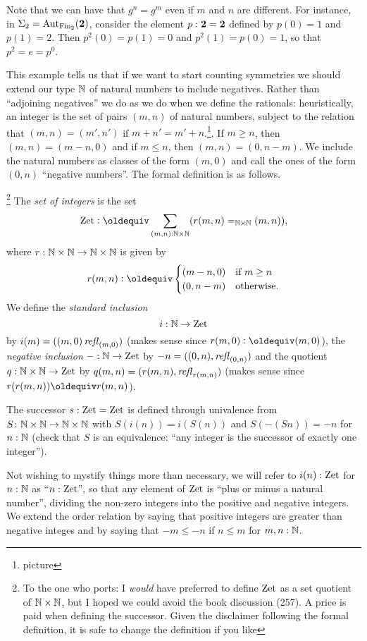 {\begin{example}
Note that we can have that $g^n=g^m$ even if $m$ and $n$ are different.  For instance, in $\Sigma_2=\mathrm{Aut}_{\operatorname{Fin}_2}(\mathbf{2} )$, consider the element $p:\mathbf{2} =\mathbf{2} $ defined by $p(0)=1$ and $p(1)=2$.  Then $p^2(0)=p(1)=0$ and $p^2(1)=p(0)=1$, so that $p^2=e=p^0$.
   \end{example}
This example tells us that if we want to start counting symmetries we should extend our type $\mathbb{N}$ of natural numbers to include negatives.  Rather than ``adjoining negatives'' we do as we do when we define the rationals: heuristically, an integer is the set of pairs $(m,n)$ of natural numbers, subject to the relation that $(m,n)=(m',n')$ if $m+n'=m'+n$.\footnote{picture}.  If $m\geq n$, then $(m,n)=(m-n,0)$ and if $m\leq n$, then $(m,n)=(0,n-m)$.  We include the natural numbers as classes of the form $(m,0)$ and call the ones of the form $(0,n)$ ``negative numbers''.  The formal definition is as follows.
\begin{definition}
\footnote{To the one who ports: I \emph{would} have preferred to define $\mathrm{Zet}$ as a set quotient of $\mathbb{N}\times\mathbb{N}$, but I hoped we could avoid the book discussion (257).  A price is paid when defining the successor.  Given the disclaimer following the formal definition, it is safe to change the definition if you like}
  The \emph{set of integers} is the set
$$\zet\defequi \sum_{(m,n):\NN\times\NN}(r(m,n)=_{\NN\times\NN}(m,n)),$$
where $r:\mathbb{N}\times\mathbb{N}\to\mathbb{N}\times\mathbb{N}$ is given by
$$r(m,n)\defequi
\begin{cases}
  (m-n,0)&\text{if $m\geq n$}\\
  (0,n-m)&\text{otherwise.}
\end{cases}
$$
We define the \emph{standard inclusion} 
$$i:\mathbb{N}\to\mathrm{Zet}$$ by $i(m)=((m,0)\mathop{{\it refl}_{(m,0)}})$ (makes sense since $r(m,0)\defequi(m,0)$), the \emph{negative inclusion} $-:\mathbb{N}\to\mathrm{Zet}$ by $-n=((0,n),\mathop{{\it refl}_{(0,n)}})$ and the quotient $q:\mathbb{N}\times\mathbb{N}\to\mathrm{Zet}$ by $q(m,n)=(r(m,n),\mathop{{\it refl}_{r(m,n)}})$ (makes sense since $r(r(m,n))\oldequiv r(m,n)$).  

The successor $s:\mathrm{Zet}=\mathrm{Zet}$ is defined through univalence from $S\colon\mathbb{N}\times\mathbb{N}\to\mathbb{N}\times\mathbb{N}$ with $S(i(n))=i(S(n))$  and $S(-(Sn))=-n$ for $n:\mathbb{N}$ (check that $S$ is an equivalence: ``any integer is the successor of exactly one integer'').
\end{definition}

Not wishing to mystify things more than necessary, we will refer to $i(n):\mathrm{Zet}$ for $n:\mathbb{N}$ as ``$n:\mathrm{Zet}$'', so that any element of $\mathrm{Zet}$ is ``plus or minus a natural number'', dividing the non-zero integers into the positive and negative integers.  We extend the order relation by saying that positive integers are greater than negative integes and by saying that $-m\leq -n$ if $n\leq m$ for $m,n:\mathbb{N}$.
}%

